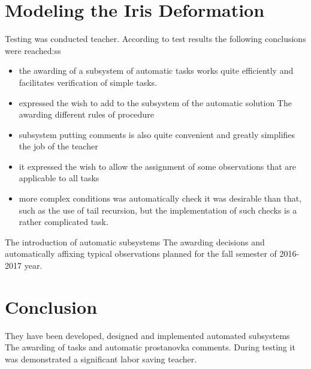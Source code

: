 \documentclass{acmtog} %
\begin{document}
\section{Modeling the Iris Deformation}
\label{sec:patterndeformations}

Testing was conducted teacher. According to test results the following conclusions were reached:ss
\begin{itemize}
\item the awarding of a subsystem of automatic tasks works quite efficiently and facilitates verification of simple tasks.
\item expressed the wish to add to the subsystem of the automatic solution The awarding different rules of procedure
\item subsystem putting comments is also quite convenient and greatly simplifies the job of the teacher
\item it expressed the wish to allow the assignment of some observations that are applicable to all tasks
\item more complex conditions was automatically check it was desirable than that, such as the use of tail recursion, but the implementation of such checks is a rather complicated task.
\end{itemize}
The introduction of automatic subsystems The awarding decisions and automatically affixing typical observations planned for the fall semester of 2016-2017 year.


\section{Conclusion}
\label{sec:conclusion}
%
They have been developed, designed and implemented automated subsystems The awarding of tasks and automatic prostanovka comments. During testing it was demonstrated a significant labor saving teacher.

\end{document}
